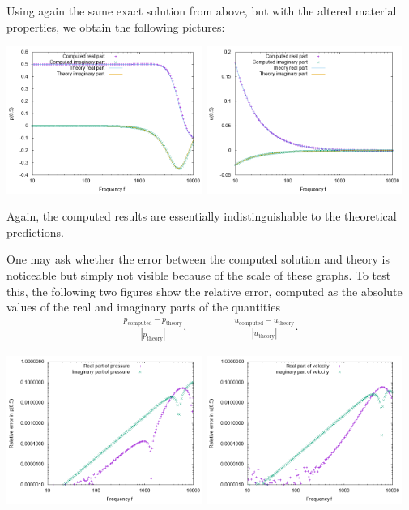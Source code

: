 \documentclass{article}
\begin{document}
Using again the same exact solution from above, but with the altered
material properties, we obtain the following pictures:
\begin{center}
\includegraphics[width=0.48\textwidth]{wave-guide-tet-real-material/pressure-at-center.png}
\includegraphics[width=0.48\textwidth]{wave-guide-tet-real-material/velocity-at-center.png}
\end{center}
Again, the computed results are essentially indistinguishable to the
theoretical predictions.

One may ask whether the error between the computed solution and theory
is noticeable but simply not visible because of the scale of these
graphs. To test this, the following two figures show the relative
error, computed as the absolute values of the real and imaginary parts
of the quantities
\begin{align*}
  \frac{p_\text{computed} - p_\text{theory}}{|p_\text{theory}|},
  \qquad\qquad
  \frac{u_\text{computed} - u_\text{theory}}{|u_\text{theory}|}.
\end{align*}
\begin{center}
\includegraphics[width=0.48\textwidth]{wave-guide-tet-real-material/error-pressure-at-center.png}
\includegraphics[width=0.48\textwidth]{wave-guide-tet-real-material/error-velocity-at-center.png}
\end{center}
\end{document}
